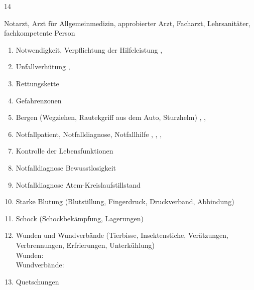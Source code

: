   \begin{inparadesc}
    \item[Stundenanzahl:] 14
    \item[Lehrkraft:] Notarzt, Arzt für Allgemeinmedizin, approbierter Arzt,
    Facharzt, Lehrsanitäter, fachkompetente Person
  \end{inparadesc}
  \begin{enumerate}
    \item
    Notwendigkeit, Verpflichtung der Hilfeleistung \dotfill {},
    \item
    Unfallverhütung \dotfill {},
    \item
    Rettungskette \dotfill \noindent{}
    \item
    Gefahrenzonen \dotfill \noindent{}
    \item
    Bergen (Wegziehen, Rautekgriff aus dem  Auto, Sturzhelm) \dotfill  {},
    ,
    \item
    Notfallpatient, Notfalldiagnose, Notfallhilfe \dotfill {},
    ,
    ,
    \item    Kontrolle der Lebensfunktionen \dotfill \noindent{}
    \item    Notfalldiagnose Bewusstlosigkeit \dotfill  {}
    \item    Notfalldiagnose  Atem-Kreislaufstillstand \dotfill {}
    \item    Starke Blutung (Blutstillung, Fingerdruck,  Druckverband, Abbindung) \dotfill {}
    \item    Schock (Schockbekämpfung,  Lagerungen) \dotfill {}
    \item    Wunden und Wundverbände (Tierbisse, Insektenstiche, Verätzungen,
    Verbrennungen, Erfrierungen, Unterkühlung)
    \\
    Wunden:  \dotfill {} \\
    Wundverbände:  \dotfill {}
    \item    Quetschungen \dotfill {}

\end{enumerate}
